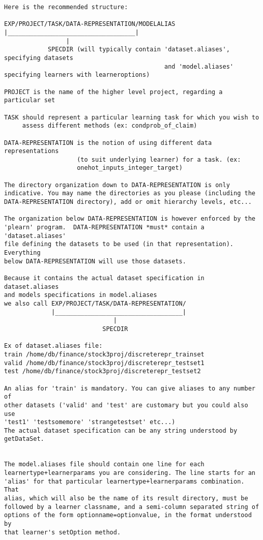 \documentclass[11pt]{book}
\begin{document}
{\begin{verbatim}
Here is the recommended structure:

EXP/PROJECT/TASK/DATA-REPRESENTATION/MODELALIAS
|___________________________________|
                 |
            SPECDIR (will typically contain 'dataset.aliases', specifying datasets 
                                            and 'model.aliases' specifying learners with learneroptions)

PROJECT is the name of the higher level project, regarding a particular set

TASK should represent a particular learning task for which you wish to
     assess different methods (ex: condprob_of_claim)

DATA-REPRESENTATION is the notion of using different data representations
                    (to suit underlying learner) for a task. (ex:
                    onehot_inputs_integer_target)

The directory organization down to DATA-REPRESENTATION is only
indicative. You may name the directories as you please (including the
DATA-REPRESENTATION directory), add or omit hierarchy levels, etc...

The organization below DATA-REPRESENTATION is however enforced by the
'plearn' program.  DATA-REPRESENTATION *must* contain a 'dataset.aliases'
file defining the datasets to be used (in that representation). Everything
below DATA-REPRESENTATION will use those datasets. 

Because it contains the actual dataset specification in dataset.aliases 
and models specifications in model.aliases
we also call EXP/PROJECT/TASK/DATA-REPRESENTATION/
             |___________________________________|
                              |
                           SPECDIR

Ex of dataset.aliases file:
train /home/db/finance/stock3proj/discreterepr_trainset
valid /home/db/finance/stock3proj/discreterepr_testset1
test /home/db/finance/stock3proj/discreterepr_testset2

An alias for 'train' is mandatory. You can give aliases to any number of
other datasets ('valid' and 'test' are customary but you could also use
'test1' 'testsomemore' 'strangetestset' etc...)
The actual dataset specification can be any string understood by getDataSet.


The model.aliases file should contain one line for each
learnertype+learnerparams you are considering. The line starts for an
'alias' for that particular learnertype+learnerparams combination. That
alias, which will also be the name of its result directory, must be
followed by a learner classname, and a semi-column separated string of
options of the form optionname=optionvalue, in the format understood by
that learner's setOption method.


\end{verbatim}}
\end{document}
